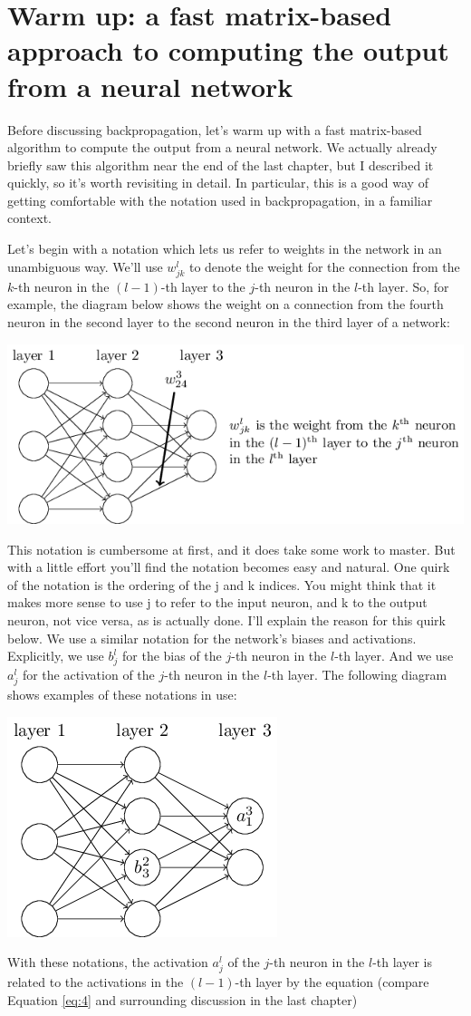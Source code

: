 \documentclass[a4paper,twoside,10pt]{book}
\begin{document}
\section{Warm up: a fast matrix-based approach to computing the output from a neural network}
Before discussing backpropagation, let's warm up with a fast matrix-based algorithm to compute the output from a neural network. We actually already briefly saw this algorithm near the end of the last chapter, but I described it quickly, so it's worth revisiting in detail. In particular, this is a good way of getting comfortable with the notation used in backpropagation, in a familiar context.

Let's begin with a notation which lets us refer to weights in the network in an unambiguous way. We'll use $w^l_{jk}$ to denote the weight for the connection from the $k$-th neuron in the $(l-1)$-th layer to the $j$-th neuron in the $l$-th layer. So, for example, the diagram below shows the weight on a connection from the fourth neuron in the second layer to the second neuron in the third layer of a network:

\begin{center}
	\includegraphics[width=0.7\linewidth]{./figures/ch2/tikz16}
\end{center}
This notation is cumbersome at first, and it does take some work to master. But with a little effort you'll find the notation becomes easy and natural. One quirk of the notation is the ordering of the j and k indices. You might think that it makes more sense to use j to refer to the input neuron, and k to the output neuron, not vice versa, as is actually done. I'll explain the reason for this quirk below.
We use a similar notation for the network's biases and activations. Explicitly, we use $b^l_j$ for the bias of the $j$-th neuron in the $l$-th layer. And we use $a^l_j$ for the activation of the $j$-th neuron in the $l$-th layer. The following diagram shows examples of these notations in use:
\begin{center}
\includegraphics[width=0.5\linewidth]{./figures/ch2/tikz17}
\end{center}
With these notations, the activation $a^l_j$ of the $j$-th neuron in the $l$-th layer is related to the activations in the $(l-1)$-th layer by the equation (compare Equation \ref{eq:4} and surrounding discussion in the last chapter)
\end{document}
